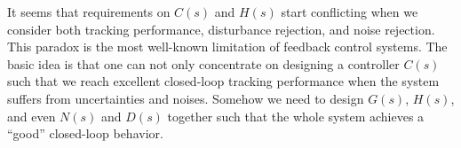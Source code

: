 \documentclass[twoside]{article}
\begin{document}
It seems that requirements on $C(s)$ and $H(s)$ start conflicting when we consider both tracking performance, disturbance rejection, and noise rejection. This paradox is the most well-known limitation of feedback control systems. The basic idea is that one can not only concentrate on designing a controller $C(s)$ such that we reach excellent closed-loop tracking performance when the system suffers from uncertainties and noises. Somehow we need to design $G(s)$, $H(s)$, and even $N(s)$ and $D(s)$ together such that the whole system achieves a ``good'' closed-loop behavior. 
  
  
\end{document}
